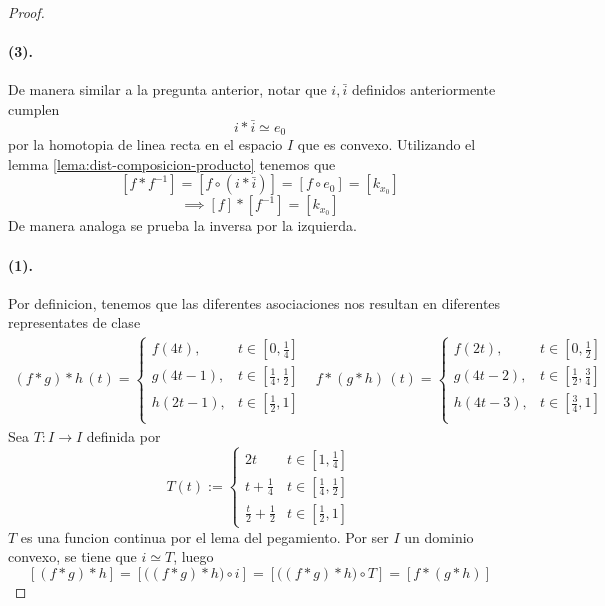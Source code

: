 \begin{proof}
\paragraph{(3).} De manera similar a la pregunta anterior, notar que \(i,
\bar{i}\) definidos anteriormente cumplen
\[ i * \bar{i} \simeq e_0 \]
por la homotopia de linea recta en el espacio \(I\) que es convexo.
Utilizando el lemma \eqref{lema:dist-composicion-producto} tenemos que
\[ [f * f^{-1}] = [f \circ (i * \bar{i})] = [f \circ e_0] = [k_{x_0}] \]
\[ \implies [f] * [f^{-1}] = [k_{x_0}] \]
De manera analoga se prueba la inversa por la izquierda.

\paragraph{(1).}
Por definicion, tenemos que las diferentes asociaciones nos resultan en
diferentes representates de clase
\[
  \begin{matrix}
    (f * g) * h \, (t) =
    \begin{cases}
      f (4t), & t \in [0, \frac 1 4] \\
      g (4t - 1), & t \in [\frac 1 4, \frac 1 2] \\
      h (2t - 1), & t \in [\frac 1 2, 1] \\
    \end{cases} &
    f * (g * h) \, (t) =
    \begin{cases}
      f (2t), & t \in [0, \frac 1 2] \\
      g (4t - 2), & t \in [\frac 1 2, \frac 3 4] \\
      h (4t - 3), & t \in [\frac 3 4, 1] \\
    \end{cases}
  \end{matrix}
\]
Sea \(T : I \to I\) definida por
\[ T (t) :=
  \begin{cases}
    2t & t \in [1 , \frac 1 4] \\
    t + \frac 1 4 & t \in [\frac 1 4, \frac 1 2] \\
    \frac t 2 + \frac 1 2 & t \in [\frac 1 2, 1]
  \end{cases}
\]
\(T\) es una funcion continua por el lema del pegamiento. Por ser \(I\)
un dominio convexo, se tiene que \(i \simeq T\), luego
\[ [(f * g) * h] = [\big( (f * g) * h \big) \circ i] = [\big( (f * g) *
  h \big) \circ T ] = [f * (g * h)] \]
\end{proof}
